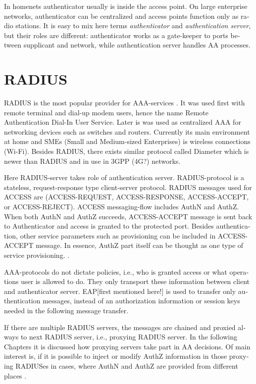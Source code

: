 \documentclass[12pt,a4paper,english]{tutthesis}
\begin{document}
\begin{otherlanguage}{english}
In homenets authenticator usually is inside the access point.
On large enterprise networks, authenticator can be centralized 
and access points function only as radio stations.
It is easy to mix here terms \emph{authenticator} and \emph{authentication
server}, but their roles are different: authenticator works as a
gate-keeper to ports between supplicant and network, while
authentication server handles AA processes.

\section{RADIUS}
\label{sec-2-2}
\label{sec:radius}
RADIUS is the most popular provider for
AAA-services \cite[p.75]{radius-popular}.  It was used first with remote terminal and dial-up modem users, hence the name Remote
Authentication Dial-In User Service. Later is was used as centralized AAA
for networking devices such as switches and routers.  Currently its
main environment at home and SMEs (Small and Medium-sized Enterprises) is
wireless connections (Wi-Fi).  Besides RADIUS, there exists similar protocol
called Diameter which is newer than RADIUS and in use in 3GPP (4G?)
networks. 

Here RADIUS-server takes role of authentication server.
RADIUS-protocol is a stateless, request-response type client-server
protocol.  RADIUS messages used for ACCESS are (ACCESS-REQUEST,
ACCESS-RESPONSE, ACCESS-ACCEPT, or ACCESS-REJECT). ACCESS
messaging-flow includes AuthN and AuthZ. When both AuthN and AuthZ
succeeds, ACCESS-ACCEPT message is sent back to Authenticator and
access is granted to the protected port.  Besides authentication, other
service parameters such as provisioning can be included in
ACCESS-ACCEPT message. In essence, AuthZ part itself can be thought as
one type of service provisioning. \cite{rfc5608}.




AAA-protocols do not dictate policies, i.e., who is granted access or
what operations user is allowed to do. They only transport these information
between client and authenticator server.
EAP[first mentioned here!] is used to transfer only authentication
messages, instead of an authorization information or session keys needed
in the following message transfer. 

If there are multiple RADIUS servers, the messages are chained and
proxied always to next RADIUS server, i.e.,   proxying RADIUS server.
In the following Chapters it is discussed how proxying servers take 
part in AA decisions. Of main interest is, if it is possible 
to inject or modify AuthZ information in those proxying RADIUSes in cases, 
where AuthN and AuthZ are provided from different
places \cite{rfc2607}.



\end{otherlanguage}
\end{document}

